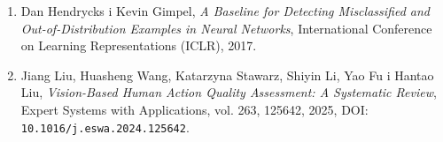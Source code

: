 \documentclass[12pt,a4paper]{report}
\begin{document}
\begin{enumerate}
  \item Dan Hendrycks i Kevin Gimpel, \textit{A Baseline for Detecting
  Misclassified and Out-of-Distribution Examples in Neural Networks},
  International Conference on Learning Representations (ICLR), 2017.

  \item Jiang Liu, Huasheng Wang, Katarzyna Stawarz, Shiyin Li, Yao Fu i Hantao
  Liu, \textit{Vision-Based Human Action Quality Assessment: A Systematic
  Review}, Expert Systems with Applications, vol. 263, 125642, 2025,
  DOI: \texttt{10.1016/j.eswa.2024.125642}.
\end{enumerate}
\end{document}
